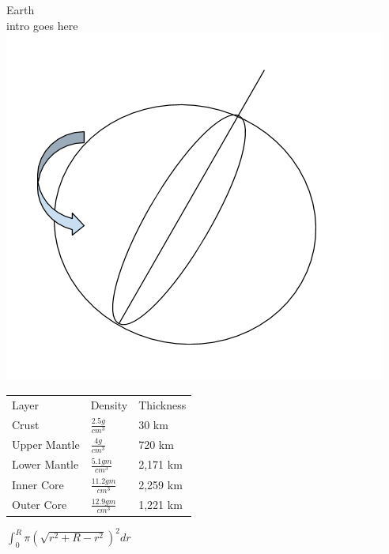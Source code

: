 \documentclass[a4paper, 11pt, oneside]{book} %
\begin{document}
{\pagebreak
\centering %
\vspace{0.5\baselineskip} %
{\LARGE Earth\\} %
\vspace{0.5\baselineskip} %
intro goes here\\
\includegraphics[scale=0.8]{earth}\\
\vspace{0.5\baselineskip} %
\begin{table}[!h]
\begin{tabular}{lll}
Layer & Density & Thickness \\
Crust & $\frac{2.5 g}{cm^3}$ & 30 km \\
Upper Mantle & $\frac{4 g}{cm^3}$ & 720 km \\
Lower Mantle & $\frac{5.1 gm}{cm^3}$ & 2,171 km \\
Inner Core & $\frac{11.2 gm}{cm^3}$ & 2,259 km \\
Outer Core & $\frac{12.9 gm}{cm^3}$ & 1,221 km
\end{tabular}
\end{table}
$\int_{0}^{R}\pi(\sqrt{r^2+R-r^2})^2dr$
}
\end{document}
